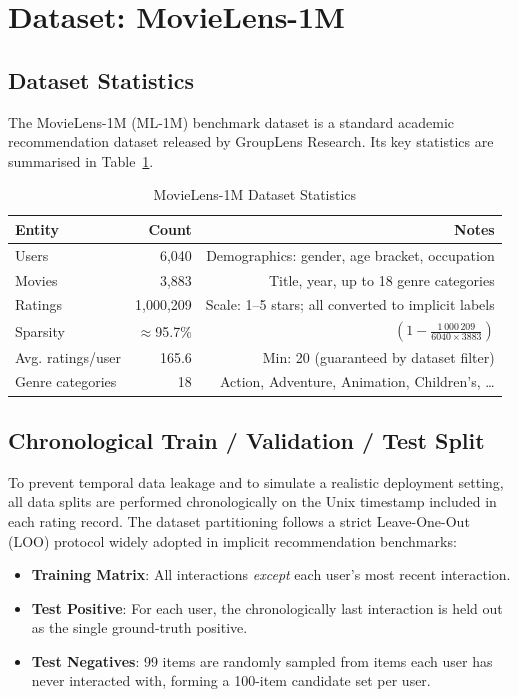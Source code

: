 \documentclass[11pt,a4paper]{article}
\begin{document}
\section{Dataset: MovieLens-1M}

\subsection{Dataset Statistics}

The MovieLens-1M (ML-1M) benchmark dataset is a standard academic recommendation dataset released by GroupLens Research. Its key statistics are summarised in Table~\ref{tab:dataset_stats}.

\begin{table}[H]
  \centering
  \caption{MovieLens-1M Dataset Statistics}
  \label{tab:dataset_stats}
  \begin{tabular}{lrr}
    \toprule
    \textbf{Entity} & \textbf{Count} & \textbf{Notes} \\
    \midrule
    Users           & 6,040          & Demographics: gender, age bracket, occupation \\
    Movies          & 3,883          & Title, year, up to 18 genre categories \\
    Ratings         & 1,000,209      & Scale: 1–5 stars; all converted to implicit labels \\
    Sparsity        & $\approx$95.7\% & $(1 - \frac{1\,000\,209}{6040\times3883})$ \\
    \midrule
    Avg. ratings/user & 165.6        & Min: 20 (guaranteed by dataset filter) \\
    Genre categories  & 18           & Action, Adventure, Animation, Children's, \ldots \\
    \bottomrule
  \end{tabular}
\end{table}

\subsection{Chronological Train / Validation / Test Split}

To prevent temporal data leakage and to simulate a realistic deployment setting, all data splits are performed chronologically on the Unix timestamp included in each rating record. The dataset partitioning follows a strict Leave-One-Out (LOO) protocol widely adopted in implicit recommendation benchmarks:

\begin{itemize}[leftmargin=1.5em]
  \item \textbf{Training Matrix}: All interactions \textit{except} each user's most recent interaction.
  \item \textbf{Test Positive}: For each user, the chronologically last interaction is held out as the single ground-truth positive.
  \item \textbf{Test Negatives}: 99 items are randomly sampled from items each user has never interacted with, forming a 100-item candidate set per user.
\end{itemize}
\end{document}
